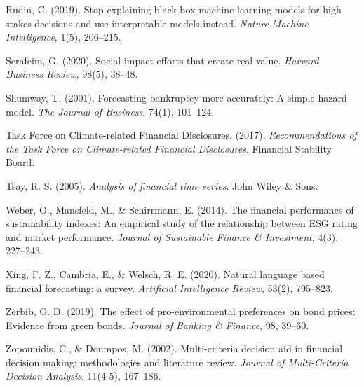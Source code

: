 \begin{thebibliography}{100}
Rudin, C. (2019). Stop explaining black box machine learning models for high stakes decisions and use interpretable models instead. \textit{Nature Machine Intelligence}, 1(5), 206--215.

Serafeim, G. (2020). Social-impact efforts that create real value. \textit{Harvard Business Review}, 98(5), 38--48.

Shumway, T. (2001). Forecasting bankruptcy more accurately: A simple hazard model. \textit{The Journal of Business}, 74(1), 101--124.

Task Force on Climate-related Financial Disclosures. (2017). \textit{Recommendations of the Task Force on Climate-related Financial Disclosures}. Financial Stability Board.

Tsay, R. S. (2005). \textit{Analysis of financial time series}. John Wiley \& Sons.

Weber, O., Mansfeld, M., \& Schirrmann, E. (2014). The financial performance of sustainability indexes: An empirical study of the relationship between ESG rating and market performance. \textit{Journal of Sustainable Finance \& Investment}, 4(3), 227--243.

Xing, F. Z., Cambria, E., \& Welsch, R. E. (2020). Natural language based financial forecasting: a survey. \textit{Artificial Intelligence Review}, 53(2), 795--823.

Zerbib, O. D. (2019). The effect of pro-environmental preferences on bond prices: Evidence from green bonds. \textit{Journal of Banking \& Finance}, 98, 39--60.

Zopounidis, C., \& Doumpos, M. (2002). Multi-criteria decision aid in financial decision making: methodologies and literature review. \textit{Journal of Multi-Criteria Decision Analysis}, 11(4-5), 167--186.

\end{thebibliography}